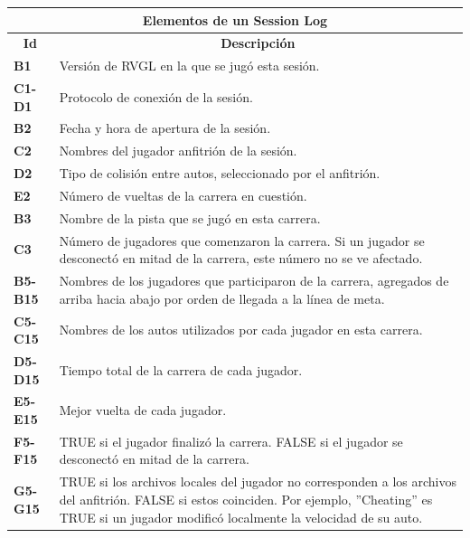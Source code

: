 \begin{center}
	\begin{tabular}{ | l | p{15cm} |}
		\hline
		\multicolumn{2}{|c|}{\textbf{Elementos de un Session Log}} \\
		\hline
		\multicolumn{1}{|c|}{\textbf{Id}} & \multicolumn{1}{|c|}{\textbf{Descripción}} \\
		\hline
		{\textbf{B1}} & Versión de RVGL en la que se jugó esta sesión. \\ \hline
		
		{\textbf{C1-D1}} & Protocolo de conexión de la sesión. \\ \hline
		
		{\textbf{B2}} & Fecha y hora de apertura de la sesión. \\ \hline
		
		{\textbf{C2}} & Nombres del jugador anfitrión de la sesión. \\ \hline
		
		{\textbf{D2}} & Tipo de colisión entre autos, seleccionado por el anfitrión. \\ \hline
		
		{\textbf{E2}} & Número de vueltas de la carrera en cuestión. \\ \hline
		
		{\textbf{B3}} & Nombre de la pista que se jugó en esta carrera. \\ \hline
		
		{\textbf{C3}} & Número de jugadores que comenzaron la carrera. Si un jugador se desconectó en mitad de la carrera, este número no se ve afectado. \\ \hline
		
		{\textbf{B5-B15}} & Nombres de los jugadores que participaron de la carrera, agregados de arriba hacia abajo por orden de llegada a la línea de meta. \\ \hline
		
		{\textbf{C5-C15}} & Nombres de los autos utilizados por cada jugador en esta carrera. \\ \hline
		
		{\textbf{D5-D15}} & Tiempo total de la carrera de cada jugador.\\ \hline
		
		{\textbf{E5-E15}} & Mejor vuelta de cada jugador.\\ \hline
		
		{\textbf{F5-F15}} & TRUE si el jugador finalizó la carrera. FALSE si el jugador se desconectó en mitad de la carrera.\\ \hline
		
		{\textbf{G5-G15}} & TRUE si los archivos locales del jugador no corresponden a los archivos del anfitrión. FALSE si estos coinciden. Por ejemplo, ''Cheating'' es TRUE si un jugador modificó localmente la velocidad de su auto.\\ \hline
	\end{tabular}
\end{center}

